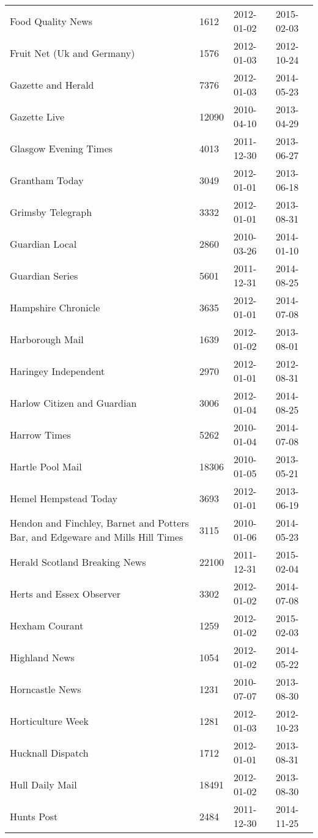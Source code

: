 \begin{longtable}{p{}p{}p{}p{}}
  Food Quality News & 1612 & 2012-01-02 & 2015-02-03 \\ 
  Fruit Net (Uk and Germany) & 1576 & 2012-01-03 & 2012-10-24 \\ 
  Gazette and Herald & 7376 & 2012-01-03 & 2014-05-23 \\ 
  Gazette Live & 12090 & 2010-04-10 & 2013-04-29 \\ 
  Glasgow Evening Times & 4013 & 2011-12-30 & 2013-06-27 \\ 
  Grantham Today & 3049 & 2012-01-01 & 2013-06-18 \\ 
  Grimsby Telegraph & 3332 & 2012-01-01 & 2013-08-31 \\ 
  Guardian Local & 2860 & 2010-03-26 & 2014-01-10 \\ 
  Guardian Series & 5601 & 2011-12-31 & 2014-08-25 \\ 
  Hampshire Chronicle & 3635 & 2012-01-01 & 2014-07-08 \\ 
  Harborough Mail & 1639 & 2012-01-02 & 2013-08-01 \\ 
  Haringey Independent & 2970 & 2012-01-01 & 2012-08-31 \\ 
  Harlow Citizen and Guardian & 3006 & 2012-01-04 & 2014-08-25 \\ 
  Harrow Times & 5262 & 2010-01-04 & 2014-07-08 \\ 
  Hartle Pool Mail & 18306 & 2010-01-05 & 2013-05-21 \\ 
  Hemel Hempstead Today & 3693 & 2012-01-01 & 2013-06-19 \\ 
  Hendon and Finchley, Barnet and Potters Bar, and Edgeware and Mills Hill Times & 3115 & 2010-01-06 & 2014-05-23 \\ 
  Herald Scotland Breaking News & 22100 & 2011-12-31 & 2015-02-04 \\ 
  Herts and Essex Observer & 3302 & 2012-01-02 & 2014-07-08 \\ 
  Hexham Courant & 1259 & 2012-01-02 & 2015-02-03 \\ 
  Highland News & 1054 & 2012-01-02 & 2014-05-22 \\ 
  Horncastle News & 1231 & 2010-07-07 & 2013-08-30 \\ 
  Horticulture Week & 1281 & 2012-01-03 & 2012-10-23 \\ 
  Hucknall Dispatch & 1712 & 2012-01-01 & 2013-08-31 \\ 
  Hull Daily Mail & 18491 & 2012-01-02 & 2013-08-30 \\ 
  Hunts Post & 2484 & 2011-12-30 & 2014-11-25 \\ 

\end{longtable}
